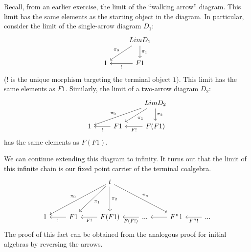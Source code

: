 \documentclass[DaoFP]{subfiles}
\begin{document}
Recall, from an earlier exercise, the limit of the ``walking arrow'' diagram. This limit has the same elements as the starting object in the diagram. In particular, consider the limit of the single-arrow diagram $D_1$:
\[
 \begin{tikzcd}
 & Lim D_1
 \arrow[dl, "\pi_0"']
\arrow[d, "\pi_1"]
 \\
 1 
 & F1
 \arrow[l, "!"]
 \end{tikzcd}
\]
($!$ is the unique morphism targeting the terminal object $1$). This limit has the same elements as $F 1$. Similarly, the limit of a two-arrow diagram $D_2$:
\[
 \begin{tikzcd}
 && Lim D_2
 \arrow[dll, "\pi_0"']
\arrow[dl, "\pi_1"]
\arrow[d, "\pi_2"]
 \\
 1 
 & F1
 \arrow[l, "!"]
  & F(F 1)
 \arrow[l, "F !"]
\end{tikzcd}
\]
has the same elements as $F(F 1)$.

We can continue extending this diagram to infinity. It turns out that the limit of this infinite chain is our fixed point carrier of the terminal coalgebra.
\[
 \begin{tikzcd}
  && t
  \arrow[ddll, "\pi_0"']
  \arrow[ddl, "\pi_1"]
  \arrow[dd, "\pi_2"]
  \arrow[ddrr, "\pi_n"]
\\
\\
 1 
 & F 1
 \arrow[l, "!"]
 & F (F 1)
 \arrow[l, "F !"]
 & ...
 \arrow[l, "F(F !)"]
 & F^n 1
  \arrow[l]
 & ...
  \arrow[l, "F^n !"]
 \end{tikzcd}
\]
The proof of this fact can be obtained from the analogous proof for initial algebras by reversing the arrows.
\end{document}
